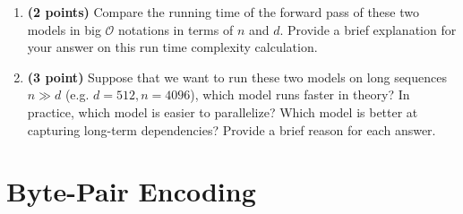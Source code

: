 \documentclass[11pt, letterpaper]{article}
\begin{document}
\begin{enumerate}
    \item \textbf{(2 points)} Compare the running time of the forward pass of these two models in big $\mathcal{O}$ notations in terms of $n$ and $d$.  Provide a brief explanation for your answer on this run time complexity calculation. 
    
    \item \textbf{(3 point)} Suppose that we want to run these two models on long sequences $n \gg d$ (e.g. $d = 512, n = 4096$), which model runs faster in theory? In practice, which model is easier to parallelize? Which model is better at capturing long-term dependencies? Provide a brief reason for each answer.
\end{enumerate}
    

\newpage

\section{Byte-Pair Encoding}
\end{document}
